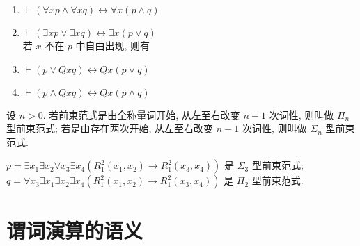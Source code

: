 \documentclass[
    mode=hazy,
    color=blue,
    device=normal,
    lang=cn
]{elegantnote}
\begin{document}
\begin{proposition}
    \hfill
    \begin{enumerate}[label = $\arabic*^\circ$]
        \item $\vdash (\forall x p \land \forall x q)\leftrightarrow \forall x(p\land q)$
        \item $\vdash (\exists x p \lor \exists x q)\leftrightarrow \exists x(p\lor q)$\\
              若 $x$ 不在 $p$ 中自由出现, 则有
        \item $\vdash (p\lor Qxq)\leftrightarrow Qx(p\lor q)$
        \item $\vdash (p\land Qxq)\leftrightarrow Qx(p\land q)$
    \end{enumerate}
\end{proposition}
\begin{definition}
    设 $n>0$. 若前束范式是由全称量词开始, 从左至右改变 $n-1$ 次词性, 则叫做 $\Pi_n$ 型前束范式;
    若是由存在两次开始, 从左至右改变 $n-1$ 次词性, 则叫做 $\Sigma_n$ 型前束范式.
\end{definition}
\begin{example}
    $p = \exists x_1\exists x_2\forall x_3\exists x_4 (R_1^2(x_1, x_2)\to R_1^2(x_3, x_4))$ 是 $\Sigma_3$ 型前束范式;\\
    $q = \forall x_3\exists x_1\exists x_2\exists x_4 (R_1^2(x_1, x_2)\to R_1^2(x_3, x_4))$ 是 $\Pi_2$ 型前束范式.
\end{example}

\section{谓词演算的语义}
\end{document}
